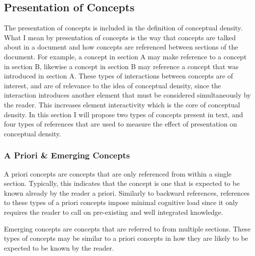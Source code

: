 \documentclass[12pt]{article}
\begin{document}

\subsection{Presentation of Concepts} \label{sec:presentation of concepts}
The presentation of concepts is included in the definition of conceptual density. What I mean by presentation of concepts is the way that concepts are talked about in a document and how concepts are referenced between sections of the document. For example, a concept in section A may make reference to a concept in section B, likewise a concept in section B may reference a concept that was introduced in section A. These types of interactions between concepts are of interest, and are of relevance to the idea of conceptual density, since the interaction introduces another element that must be considered simultaneously by the reader. This increases element interactivity which is the core of conceptual density. In this section I will propose two types of concepts present in text, and four types of references that are used to measure the effect of presentation on conceptual density.

\subsubsection{A Priori \& Emerging Concepts}
A priori concepts are concepts that are only referenced from within a single section. Typically, this indicates that the  concept is one that is expected to be known already by the reader a priori. Similarly to backward references, references to these types of a priori concepts impose minimal cognitive load since it only requires the reader to call on pre-existing and well integrated knowledge.

Emerging concepts are concepts that are referred to from multiple sections. These types of concepts may be similar to a priori concepts in how they are likely to be expected to be known by the reader.
\end{document}
